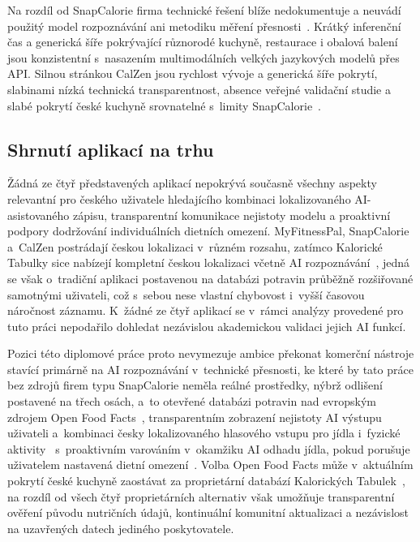 Na rozdíl od SnapCalorie firma technické řešení blíže nedokumentuje a neuvádí použitý model rozpoznávání ani metodiku měření přesnosti~\cite{calzen2025}.
Krátký inferenční čas a generická šíře pokrývající různorodé kuchyně, restaurace i obalová balení jsou konzistentní s~nasazením multimodálních velkých jazykových modelů přes API.
Silnou stránkou CalZen jsou rychlost vývoje a generická šíře pokrytí, slabinami nízká technická transparentnost, absence veřejné validační studie a slabé pokrytí české kuchyně srovnatelné s~limity SnapCalorie~\cite{li2024evaluating,aburub2025foodScanning}.

\subsection{Shrnutí aplikací na trhu}
\label{subsec:shrnutiTrhu}

Žádná ze čtyř představených aplikací nepokrývá současně všechny aspekty relevantní pro českého uživatele hledajícího kombinaci lokalizovaného AI-asistovaného zápisu, transparentní komunikace nejistoty modelu a proaktivní podpory dodržování individuálních dietních omezení.
MyFitnessPal, SnapCalorie a~CalZen postrádají českou lokalizaci v~různém rozsahu, zatímco Kalorické Tabulky sice nabízejí kompletní českou lokalizaci včetně AI rozpoznávání~\cite{dine4fit2025}, jedná se však o~tradiční aplikaci postavenou na databázi potravin průběžně rozšiřované samotnými uživateli, což s~sebou nese vlastní chybovost i~vyšší časovou náročnost záznamu.
K~žádné ze čtyř aplikací se v~rámci analýzy provedené pro tuto práci nepodařilo dohledat nezávislou akademickou validaci jejich AI funkcí.

Pozici této diplomové práce proto nevymezuje ambice překonat komerční nástroje stavící primárně na AI rozpoznávání v~technické přesnosti, ke které by tato práce bez zdrojů firem typu SnapCalorie neměla reálné prostředky, nýbrž odlišení postavené na třech osách, a~to otevřené databázi potravin nad evropským zdrojem Open Food Facts~\cite{openFoodFacts2025}, transparentním zobrazení nejistoty AI výstupu uživateli a~kombinaci česky lokalizovaného hlasového vstupu pro jídla i~fyzické aktivity~\cite{myFitnessPalVoiceLog2025,myFitnessPalLanguages2025} s~proaktivním varováním v~okamžiku AI odhadu jídla, pokud porušuje uživatelem nastavená dietní omezení~\cite{myFitnessPalCoach2025}.
Volba Open Food Facts může v~aktuálním pokrytí české kuchyně zaostávat za proprietární databází Kalorických Tabulek~\cite{dine4fit2025}, na rozdíl od všech čtyř proprietárních alternativ však umožňuje transparentní ověření původu nutričních údajů, kontinuální komunitní aktualizaci a nezávislost na uzavřených datech jediného poskytovatele.


